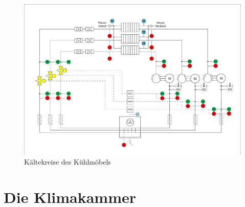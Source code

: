 \begin{figure} %
\centering
\includegraphics[scale=.6,angle=90]{Pictures/IDC150.pdf}
\caption{Kältekreise des Kühlmöbels}
\label{fig:IDC150}
\end{figure}


\section{Die Klimakammer}
\label{sec:Die Klimakammer}

